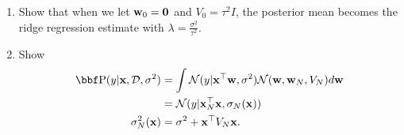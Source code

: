 \documentclass[12pt,letterpaper,fleqn]{hmcpset}
\begin{document}
\begin{enumerate}[(a)]
\begin{enumerate}
            \item Show that when we let ${\bf w}_0={\bf 0}$ and $V_0=\tau^2 I$, the posterior
                mean becomes the ridge regression estimate with
                $\lambda = \frac{\sigma^2}{\tau^2}$.
            \item Show \begin{align*}
                \PP(y|\xx,\Dc,\sigma^2) &= \int\Nc(y|\xx^\T\ww, \sigma^2)\Nc(\ww,\ww_N,V_N)d\ww\\
                    &= \Nc(y|\xx_N^\T\xx, \sigma_N(\xx))\\
                    \sigma_N^2(\xx) &= \sigma^2 + \xx^\T V_N\xx.
                \end{align*}
        \end{enumerate}
\end{enumerate}
\clearpage
\end{document}

